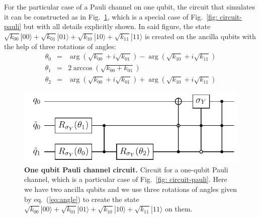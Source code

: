 \documentclass[10pt,letterpaper]{article} %
\newcommand{\fref}[1]{Fig.~\ref{#1}}
\newcommand{\eref}[1]{eq.~(\ref{#1})}
\begin{document}
For the particular case of a Pauli channel on one qubit, the circuit that
simulates it can be constructed as in \fref{fig: circuit-pauli-1},
which is a special case of \fref{fig: circuit-pauli}
but with all details  explicitly shown.
In said figure, the state 
$\sqrt{k_{00}} |00\rangle + \sqrt{k_{01}} |01\rangle + \sqrt{k_{10}} 
|10\rangle + \sqrt{k_{11}}|11\rangle$
is created on the ancilla qubits with the help of three rotations of angles:
\begin{subequations}
\begin{eqnarray}
\theta_0 &= &\arg(\sqrt{k_{00}} + i \sqrt{k_{01}}) -
\arg(\sqrt{k_{10}} + i\sqrt{k_{11}})
\label{eq:angle1} \\ 
\theta_1 &= &2 \arccos(\sqrt{k_{00} +
k_{01}})
\label{eq:angle2} \\
\theta_2 &= &\arg(\sqrt{k_{00}} + i \sqrt{k_{01}}) +
\arg(\sqrt{k_{10}} + i\sqrt{k_{11}})
\label{eq:angle3}
\end{eqnarray}
\label{eq:angle}
\end{subequations}



\begin{figure} %
\centering
\includegraphics{images/circuito_unqubit.pdf}
\caption{
{\bf One qubit Pauli channel circuit.} Circuit for a one-qubit Pauli channel,
which is a particular case of \fref{fig: circuit-pauli}.  Here we have two
ancilla qubits and we use three rotations
of angles given by \eref{eq:angle} to create the state $\sqrt{k_{00}}
|00\rangle + \sqrt{k_{01}} |01\rangle + \sqrt{k_{10}} 
|10\rangle + \sqrt{k_{11}}|11\rangle$
on them.
}
\label{fig: circuit-pauli-1} 
\end{figure} %
\end{document}
